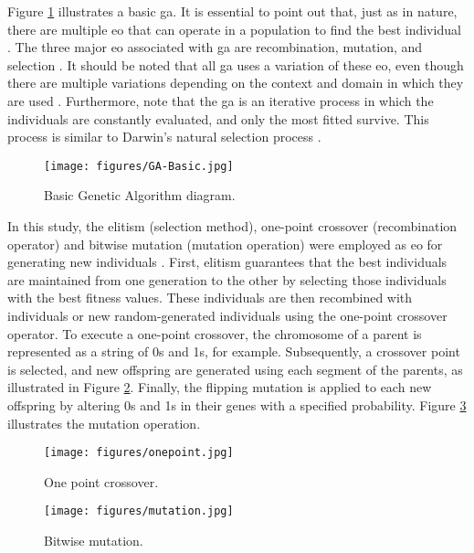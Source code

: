 \documentclass[preprint, review, 12pt]{elsarticle}
\begin{document}
Figure \ref{fig:ga-basic} illustrates a basic \gls{ga}. It is essential to point out that, just as in nature, there are multiple \gls{eo} that can operate in a population to find the best individual \cite{coello2007}. The three major \gls{eo} associated with \gls{ga} are recombination, mutation, and selection \cite{coello2007}. It should be noted that all \gls{ga} uses a variation of these \gls{eo}, even though there are multiple variations depending on the context and domain in which they are used \cite{coello2007, goldberg1989, haupt2004, sivanandam2008}. Furthermore, note that the \gls{ga} is an iterative process in which the individuals are constantly evaluated, and only the most fitted survive. This process is similar to Darwin's natural selection process \cite{darwin2023origin, coello2007, sivanandam2008}. 

\begin{figure}
    \centering
    \texttt{[image: figures/GA-Basic.jpg]}
    \caption{Basic Genetic Algorithm diagram.}
    \label{fig:ga-basic}
\end{figure}

In this study, the elitism (selection method), one-point crossover (recombination operator) and bitwise mutation (mutation operation) were employed as \gls{eo} for generating new individuals \cite{coello2007,sivanandam2008}. First, elitism guarantees that the best individuals are maintained from one generation to the other by selecting those individuals with the best fitness values. These individuals are then recombined with individuals or new random-generated individuals using the one-point crossover operator. To execute a one-point crossover, the chromosome of a parent is represented as a string of 0s and 1s, for example. Subsequently, a crossover point is selected, and new offspring are generated using each segment of the parents, as illustrated in Figure \ref{fig:onepoint}. Finally, the flipping mutation is applied to each new offspring by altering 0s and 1s in their genes with a specified probability. Figure \ref{fig:mutaton} illustrates the mutation operation. 

\begin{figure}
    \centering
    \texttt{[image: figures/onepoint.jpg]}
    \caption{One point crossover.}
    \label{fig:onepoint}
\end{figure}

\begin{figure}
    \centering
    \texttt{[image: figures/mutation.jpg]}
    \caption{Bitwise mutation.}
    \label{fig:mutaton}
\end{figure}
\end{document}

